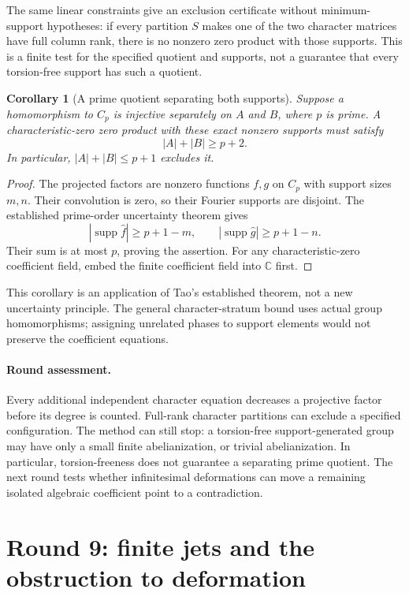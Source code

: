 \documentclass[11pt,a4paper,oneside]{report}
\newtheorem{corollary}[theorem]{Corollary}
\theoremstyle{definition}
\theoremstyle{remark}
\DeclareMathOperator{\supp}{supp}
\newcommand{\C}{\mathbb C}
\begin{document}
The same linear constraints give an exclusion certificate without
minimum-support hypotheses: if every partition $S$ makes one of
the two character matrices have full column rank, there is no
nonzero zero product with those supports. This is a finite test
for the specified quotient and supports, not a guarantee that
every torsion-free support has such a quotient.

\begin{corollary}[A prime quotient separating both supports]
\label{M13:next:prime-quotient}
Suppose a homomorphism to $C_p$ is injective separately on $A$ and
$B$, where $p$ is prime. A characteristic-zero zero product with
these exact nonzero supports must satisfy
\[
 |A|+|B|\ge p+2.
\]
In particular, $|A|+|B|\le p+1$ excludes it.
\end{corollary}
\begin{proof}
The projected factors are nonzero functions $f,g$ on $C_p$ with
support sizes $m,n$. Their convolution is zero, so their Fourier
supports are disjoint. The established prime-order uncertainty
theorem \cite{B:TaoPrime} gives
\[
 |\supp\widehat f|\ge p+1-m,
 \qquad |\supp\widehat g|\ge p+1-n.
\]
Their sum is at most $p$, proving the assertion.
For any characteristic-zero coefficient field, embed the finite
coefficient field into $\C$ first.
\end{proof}

This corollary is an application of Tao's established theorem,
not a new uncertainty principle. The general character-stratum
bound uses actual group homomorphisms; assigning unrelated phases
to support elements would not preserve the coefficient equations.

\paragraph{Round assessment.}
Every additional independent character equation decreases a
projective factor before its degree is counted. Full-rank character
partitions can exclude a specified configuration. The method can
still stop: a torsion-free support-generated group may have only a
small finite abelianization, or trivial abelianization. In particular,
torsion-freeness does not guarantee a separating prime quotient.
The next round tests whether infinitesimal deformations can move a
remaining isolated algebraic coefficient point to a contradiction.

\section{Round 9: finite jets and the obstruction to deformation}
\label{M13:next:alg-nine}
\end{document}
